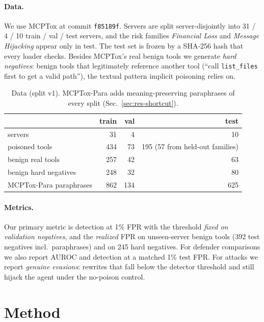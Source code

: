 \documentclass{article}
\begin{document}
\paragraph{Data.} We use MCPTox at commit \texttt{f85189f}. Servers are split server-disjointly into 31 / 4 / 10
train / val / test servers, and the risk families \emph{Financial Loss} and \emph{Message Hijacking} appear only in
test. The test set is frozen by a SHA-256 hash that every loader checks. Besides MCPTox's real benign tools we generate
\emph{hard negatives}: benign tools that legitimately reference another tool (``call \texttt{list\_files} first to get
a valid path''), the textual pattern implicit poisoning relies on.

\begin{table}[tbp]
\centering\small
\caption{Data (split v1). MCPTox-Para adds meaning-preserving paraphrases of every split (Sec.~\ref{sec:res-shortcut}).}
\label{tab:data}
\begin{tabular}{lrrr}
\toprule
 & train & val & test \\
\midrule
servers & 31 & 4 & 10 \\
poisoned tools & 434 & 73 & 195 (57 from held-out families) \\
benign real tools & 257 & 42 & 63 \\
benign hard negatives & 248 & 32 & 80 \\
MCPTox-Para paraphrases & 862 & 134 & 625 \\
\bottomrule
\end{tabular}
\end{table}

\paragraph{Metrics.} Our primary metric is detection at 1\% FPR with the threshold \emph{fixed on validation negatives},
and the \emph{realized} FPR on unseen-server benign tools (392 test negatives incl.\ paraphrases) and on 245 hard
negatives. For defender comparisons we also report AUROC and detection at a matched 1\% test FPR. For attacks we report
\emph{genuine evasions}: rewrites that fall below the detector threshold and still hijack the agent under the no-poison
control.

\section{Method}
\label{sec:method}
\end{document}
